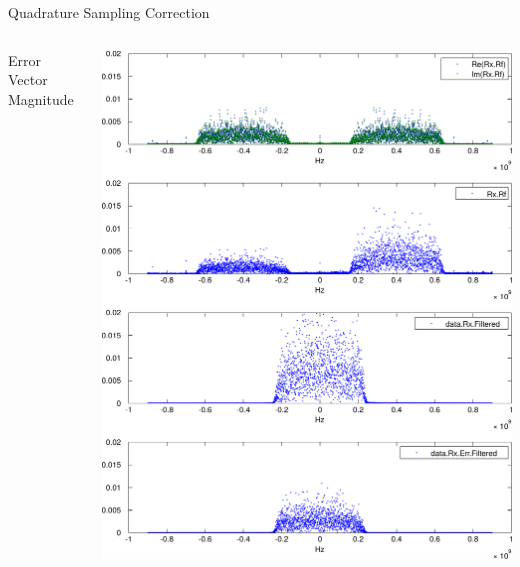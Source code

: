 \documentclass[10pt]{beamer}
\begin{document}
\begin{frame}{Quadrature Sampling Correction}
\begin{columns}[T]
\begin{column}{.5\textwidth}
{\begin{block}{Error Vector Magnitude}
\begin{tabular}{|l|r@{}l|}
          \end{tabular}
        \end{block}
      }
    \end{column}
    \begin{column}{.5\textwidth}
      \includegraphics[width=\textwidth]{figures/matlab/res_450_rx_freq}
    \end{column}
  \end{columns}
\end{frame}
\end{document}
